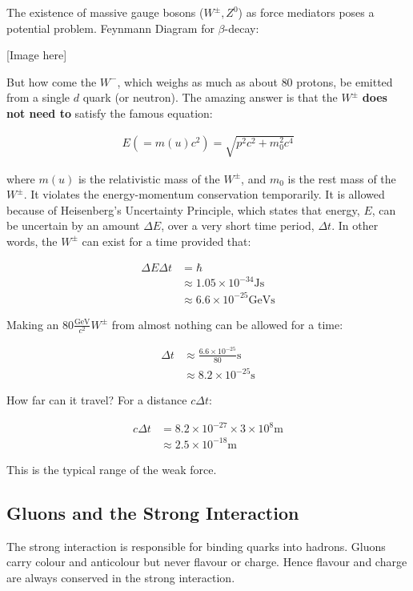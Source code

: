 \documentclass[10pt,a4paper]{article}
\newcommand{\gevcc}{\frac{\mathrm{GeV}}{c^2}}
\newcommand{\wboson}{W^{\pm}}
\newcommand{\zboson}{Z^0}
\newcommand{\wminus}{W^-}
\newcommand{\ttt}[1]{\times 10^{#1}}
\newcommand{\units}[1]{\mathrm{ #1}}
\begin{document}
The existence of massive gauge bosons ($\wboson, \zboson$) as force mediators poses a potential problem. Feynmann Diagram for $\beta$-decay:

[Image here]

But how come the $\wminus$, which weighs as much as about $80$ protons, be emitted from a single $d$ quark (or neutron). The amazing answer is that the $\wboson$ \textbf{does not need to} satisfy the famous equation:

\begin{align*}
E (= m(u) c^2) = \sqrt{p^2 c^2 + m_0^2 c^4}
\end{align*}

where $m(u)$ is the relativistic mass of the $\wboson$, and $m_0$ is the rest mass of the $\wboson$. It violates the energy-momentum conservation temporarily. It is allowed because of Heisenberg's Uncertainty Principle, which states that energy, $E$, can be uncertain by an amount $\Delta E$, over a very short time period, $\Delta t$. In other words, the $\wboson$ can exist for a time provided that:

\begin{align*}
\Delta E \Delta t &= \hbar \\
&\approx 1.05 \times 10^{-34} \mathrm{ Js} \\
&\approx 6.6 \times 10^{-25} \mathrm{ GeVs}
\end{align*}

Making an $80 \gevcc \wboson$ from almost nothing can be allowed for a time:

\begin{align*}
\Delta t &\approx \frac{6.6 \times 10^{-25}}{80} \mathrm{ s} \\
&\approx 8.2 \times 10^{-25} \mathrm{ s}
\end{align*}

How far can it travel? For a distance $c\Delta t$:

\begin{align*}
c\Delta t &= 8.2 \ttt{-27} \times 3 \ttt{8} \mathrm{ m} \\
&\approx 2.5 \ttt{-18} \units{m}
\end{align*}

This is the typical range of the weak force.

\subsection*{Gluons and the Strong Interaction}

The strong interaction is responsible for binding quarks into hadrons. Gluons carry colour and anticolour but never flavour or charge. Hence flavour and charge are always conserved in the strong interaction.
\end{document}
